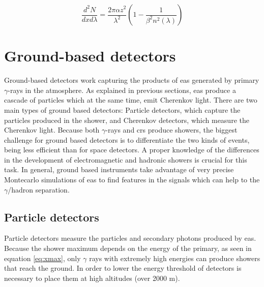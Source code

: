 \documentclass[main.tex]{subfiles}
\begin{document}
\begin{equation}
    \frac{d^2N}{dxd\lambda} = \frac{2\pi \alpha z^2}{\lambda^2}\left( 1-\frac{1}{\beta^2 n^2(\lambda)}\right)
\end{equation}

\section{Ground-based detectors} \label{sec:grounddet}

Ground-based detectors work capturing the products of \gls{eas} generated by primary $\gamma$-rays in the atmosphere. As explained in previous sections, \gls{eas} produce a cascade of particles which at the same time, emit Cherenkov light. There are two main types of ground based detectors: Particle detectors, which capture the particles produced in the shower, and Cherenkov detectors, which measure the Cherenkov light. Because both $\gamma$-rays and \glspl{cr} produce showers, the biggest challenge for ground based detectors is to differentiate the two kinds of events, being less efficient than for space detectors. A proper knowledge of the differences in the development of electromagnetic and hadronic showers is crucial for this task. In general, ground based instruments take advantage of very precise Montecarlo simulations of \gls{eas} to find features in the signals which can help to the $\gamma$/hadron separation.\\

\subsection{Particle detectors}

Particle detectors measure the particles and secondary photons produced by \gls{eas}. Because the shower maximum depends on the energy of the primary, as seen in equation \ref{eq:xmax}, only $\gamma$ rays with extremely high energies can produce showers that reach the ground. In order to lower the energy threshold of detectors is necessary to place them at high altitudes (over 2000 m). \\
\end{document}
